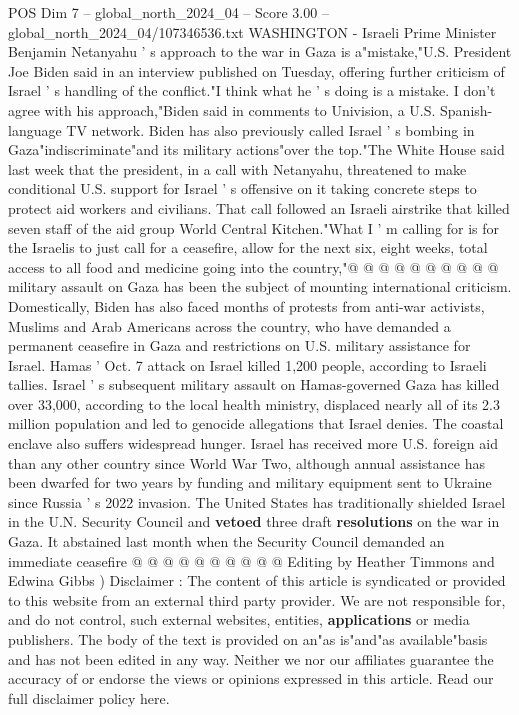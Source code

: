 \begin{textsample}{POS Dim 7 – global\_north\_2024\_04 – Score 3.00 – global\_north\_2024\_04/107346536.txt}  \label{ex:f7_pos_227}
WASHINGTON - Israeli Prime Minister Benjamin Netanyahu ' s approach to the war in Gaza is a"mistake,"U.S.
President Joe Biden said in an interview published on Tuesday, offering further criticism of Israel ' s handling of the conflict."I think what he ' s doing is a mistake.
I don't agree with his approach,"Biden said in comments to Univision, a U.S.
Spanish-language TV network.
Biden has also previously called Israel ' s bombing in Gaza"indiscriminate"and its military actions"over the top."The White House said last week that the president, in a call with Netanyahu, threatened to make conditional U.S. support for Israel ' s offensive on it taking concrete steps to protect aid workers and civilians.
That call followed an Israeli airstrike that killed seven staff of the aid group World Central Kitchen."What I ' m calling for is for the Israelis to just call for a ceasefire, allow for the next six, eight weeks, total access to all food and medicine going into the country,"@ @ @ @ @ @ @ @ @ @ military assault on Gaza has been the subject of mounting international criticism.
Domestically, Biden has also faced months of protests from anti-war activists, Muslims and Arab Americans across the country, who have demanded a permanent ceasefire in Gaza and restrictions on U.S. military assistance for Israel.
Hamas ' Oct. 7 attack on Israel killed 1,200 people, according to Israeli tallies.
Israel ' s subsequent military assault on Hamas-governed Gaza has killed over 33,000, according to the local health ministry, displaced nearly all of its 2.3 million population and led to genocide allegations that Israel denies.
The coastal enclave also suffers widespread hunger.
Israel has received more U.S. foreign aid than any other country since World War Two, although annual assistance has been dwarfed for two years by funding and military equipment sent to Ukraine since Russia ' s 2022 invasion.
The United States has traditionally shielded Israel in the U.N.
Security Council and \textbf{vetoed} three draft \textbf{resolutions} on the war in Gaza.
It abstained last month when the Security Council demanded an immediate ceasefire @ @ @ @ @ @ @ @ @ @ Editing by Heather Timmons and Edwina Gibbs ) Disclaimer : The content of this article is syndicated or provided to this website from an external third party provider.
We are not responsible for, and do not control, such external websites, entities, \textbf{applications} or media publishers.
The body of the text is provided on an"as is"and"as available"basis and has not been edited in any way.
Neither we nor our affiliates guarantee the accuracy of or endorse the views or opinions expressed in this article.
Read our full disclaimer policy here.

\end{textsample}
